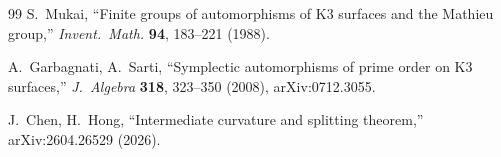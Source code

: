 \begin{thebibliography}{99}
 S.~Mukai, ``Finite groups of automorphisms of K3 surfaces and the Mathieu group,'' \textit{Invent.\ Math.} \textbf{94}, 183--221 (1988).

 A.~Garbagnati, A.~Sarti, ``Symplectic automorphisms of prime order on K3 surfaces,'' \textit{J.\ Algebra} \textbf{318}, 323--350 (2008), arXiv:0712.3055.

 J.~Chen, H.~Hong, ``Intermediate curvature and splitting theorem,'' arXiv:2604.26529 (2026).

\end{thebibliography}
